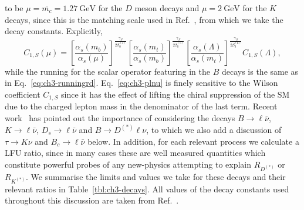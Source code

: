 to be $\mu = \overline{m_c} = \SI{1.27}{\GeV}$ for the $D$ meson decays and
$\mu = \SI{2}{\GeV} $ for the $K$ decays, since this is the matching scale used
in Ref.~\cite{Aoki:2016frl}, from which we take the decay constants. Explicitly,
\begin{equation}
  C_{1,S} (\mu) = \left[\frac{\alpha_s(m_b)}{\alpha_s(\mu)} \right]^{\frac{\gamma_S}{2\beta_0^{(4)}}} \left[\frac{\alpha_s(m_t)}{\alpha_s(m_b)} \right]^{\frac{\gamma_S}{2\beta_0^{(5)}}} \left[\frac{\alpha_s(\Lambda)}{\alpha_s(m_t)} \right]^{\frac{\gamma_S}{2\beta_0^{(6)}}} C_{1,S}(\Lambda),
\end{equation}
while the running for the scalar operator featuring in the $B$ decays is the
same as in Eq.~\eqref{eq:ch3-runningrd}. Eq.~\eqref{eq:ch3-plnu} is finely sensitive to
the Wilson coefficient $C_{1,S}$ since it has the effect of lifting the chiral
suppression of the SM due to the charged lepton mass in the denominator of the
last term. Recent work~\cite{Becirevic:2016oho} has pointed out the importance
of considering the decays $B \to \ell \bar{\nu}$, $K \to \ell \bar{\nu}$, $D_s
\to \ell \bar{\nu}$ and $B \to D^{(*)} \ell \nu$, to which we also add a
discussion of $\tau \to K \nu$ and $B_c \to \ell \bar{\nu}$ below. In addition,
for each relevant process we calculate a LFU ratio, since in many cases these
are well measured quantities which constitute powerful probes of any new-physics
attempting to explain $R_{D^{(*)}}$ or $R_{K^{(*)}}$. We summarise the limits
and values we take for these decays and their relevant ratios in
Table~\ref{tbl:ch3-decays}. All values of the decay constants used throughout this
discussion are taken from Ref.~\cite{Aoki:2016frl}.

